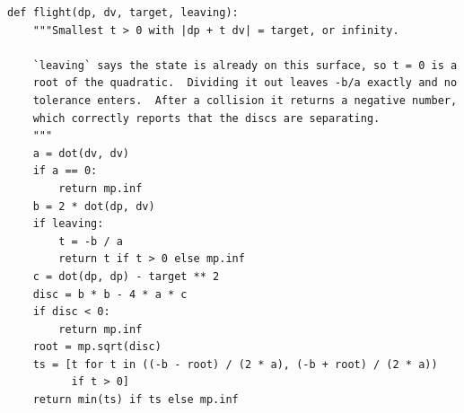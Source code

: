 \begin{verbatim}
def flight(dp, dv, target, leaving):
    """Smallest t > 0 with |dp + t dv| = target, or infinity.

    `leaving` says the state is already on this surface, so t = 0 is a
    root of the quadratic.  Dividing it out leaves -b/a exactly and no
    tolerance enters.  After a collision it returns a negative number,
    which correctly reports that the discs are separating.
    """
    a = dot(dv, dv)
    if a == 0:
        return mp.inf
    b = 2 * dot(dp, dv)
    if leaving:
        t = -b / a
        return t if t > 0 else mp.inf
    c = dot(dp, dp) - target ** 2
    disc = b * b - 4 * a * c
    if disc < 0:
        return mp.inf
    root = mp.sqrt(disc)
    ts = [t for t in ((-b - root) / (2 * a), (-b + root) / (2 * a))
          if t > 0]
    return min(ts) if ts else mp.inf
\end{verbatim}
